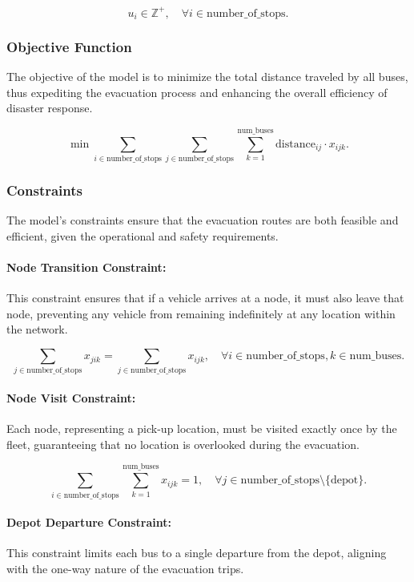 \documentclass[12pt]{article}
\begin{document}
\[
u_i \in \mathbb{Z}^+, \quad \forall i \in \text{number\_of\_stops}.
\]

\subsubsection{Objective Function}

The objective of the model is to minimize the total distance traveled by all buses, thus expediting the evacuation process and enhancing the overall efficiency of disaster response.

\[
\min \sum_{i \in \text{number\_of\_stops}} \sum_{j \in \text{number\_of\_stops}} \sum_{k=1}^{\text{num\_buses}} \text{distance}_{ij} \cdot x_{ijk}.
\]

\subsubsection{Constraints}

The model's constraints ensure that the evacuation routes are both feasible and efficient, given the operational and safety requirements.

\paragraph{Node Transition Constraint:} This constraint ensures that if a vehicle arrives at a node, it must also leave that node, preventing any vehicle from remaining indefinitely at any location within the network.

\[
\sum_{j \in \text{number\_of\_stops}} x_{jik} = \sum_{j \in \text{number\_of\_stops}} x_{ijk}, \quad \forall i \in \text{number\_of\_stops}, k \in \text{num\_buses}.
\]

\paragraph{Node Visit Constraint:} Each node, representing a pick-up location, must be visited exactly once by the fleet, guaranteeing that no location is overlooked during the evacuation.

\[
\sum_{i \in \text{number\_of\_stops}} \sum_{k=1}^{\text{num\_buses}} x_{ijk} = 1, \quad \forall j \in \text{number\_of\_stops} \setminus \{ \text{depot} \}.
\]

\paragraph{Depot Departure Constraint:} This constraint limits each bus to a single departure from the depot, aligning with the one-way nature of the evacuation trips.
\end{document}
